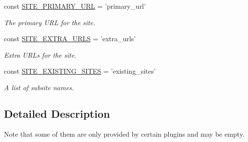 \begin{DoxyCompactItemize}
const \hyperlink{group__site__settings_gaca2cffb6c087028f71b3f74193fe3778}{S\-I\-T\-E\-\_\-\-P\-R\-I\-M\-A\-R\-Y\-\_\-\-U\-R\-L} = 'primary\-\_\-url'
\begin{DoxyCompactList}\small\item\em The primary U\-R\-L for the site. \end{DoxyCompactList}\item 
const \hyperlink{group__site__settings_ga7f80e281910ee7b5584e663f7bb3c27d}{S\-I\-T\-E\-\_\-\-E\-X\-T\-R\-A\-\_\-\-U\-R\-L\-S} = 'extra\-\_\-urls'
\begin{DoxyCompactList}\small\item\em Extra U\-R\-Ls for the site. \end{DoxyCompactList}\item 
const \hyperlink{group__site__settings_ga2ac1a89adfab61fc94edd6f4df134537}{S\-I\-T\-E\-\_\-\-E\-X\-I\-S\-T\-I\-N\-G\-\_\-\-S\-I\-T\-E\-S} = 'existing\-\_\-sites'
\begin{DoxyCompactList}\small\item\em A list of subsite names. \end{DoxyCompactList}\end{DoxyCompactItemize}


\subsection{Detailed Description}
Note that some of them are only provided by certain plugins and may be empty. 

